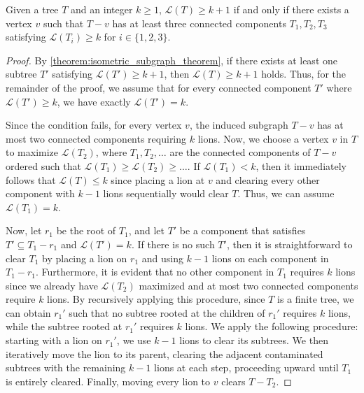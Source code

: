\documentclass[a4paper,UKenglish,cleveref, autoref, thm-restate]{lipics-v2021}
\begin{document}
\begin{lemma}\label{lemma:lion_lower_bound_lemma}
Given a tree $T$ and an integer $k \ge 1$, $\mathcal{L}(T) \ge k+1$ if and only if there exists a vertex $v$ such that $T - v$ has at least three connected components $T_1, T_2, T_3$ satisfying $\mathcal{L}(T_i) \ge k$ for $i\in\{1, 2, 3\}$.
\end{lemma}

\begin{proof}
By \cref{theorem:isometric_subgraph_theorem}, if there exists at least one subtree $T'$ satisfying $\mathcal{L}(T') \ge k+1$, then $\mathcal{L}(T) \ge k+1$ holds. Thus, for the remainder of the proof, we assume that for every connected component $T'$ where $\mathcal{L}(T') \ge k$, we have exactly $\mathcal{L}(T') = k$.

Since the condition fails, for every vertex $v$, the induced subgraph $T - v$ has at most two connected components requiring $k$ lions. Now, we choose a vertex $v$ in $T$ to maximize $\mathcal{L}(T_2)$, where $T_1, T_2, \dots$ are the connected components of $T - v$ ordered such that $\mathcal{L}(T_1)\geq \mathcal{L}(T_2) \geq \dots$. If $\mathcal{L}(T_1)<k$, then it immediately follows that $\mathcal{L}(T)\leq k$ since placing a lion at $v$ and clearing every other component with $k-1$ lions sequentially would clear $T$. Thus, we can assume $\mathcal{L}(T_1)=k$.

Now, let $r_1$ be the root of $T_1$, and let $T'$ be a component that satisfies $T'\subseteq T_1 - r_1$ and $\mathcal{L}(T')=k$. If there is no such $T'$, then it is straightforward to clear $T_1$ by placing a lion on $r_1$ and using $k-1$ lions on each component in $T_1- r_1$. Furthermore, it is evident that no other component in $T_1$ requires $k$ lions since we already have $\mathcal{L}(T_2)$ maximized and at most two connected components require $k$ lions. By recursively applying this procedure, since $T$ is a finite tree, we can obtain $r_1'$ such that no subtree rooted at the children of $r_1'$ requires $k$ lions, while the subtree rooted at $r_1'$ requires $k$ lions. We apply the following procedure: starting with a lion on $r_1'$, we use $k-1$ lions to clear its subtrees. We then iteratively move the lion to its parent, clearing the adjacent contaminated subtrees with the remaining $k-1$ lions at each step, proceeding upward until $T_1$ is entirely cleared. Finally, moving every lion to $v$ clears $T - T_2$.


\end{proof}
\end{document}
